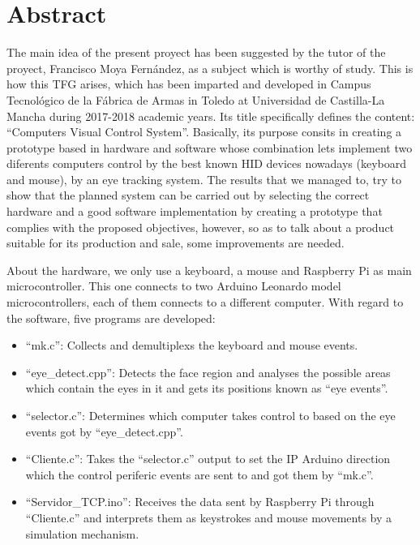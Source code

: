 \newpage
\chapter*{Abstract} \label{abstract}
\pagestyle{empty}
\thispagestyle{empty} 

The main idea of the present proyect has been suggested by the tutor of the proyect, Francisco Moya Fernández, as a subject which is worthy of study. This is how this TFG arises, which has been imparted and developed in Campus Tecnológico de la Fábrica de Armas in Toledo at Universidad de Castilla-La Mancha during 2017-2018 academic years. Its title specifically defines the content: ``Computers Visual Control System''. Basically, its purpose consits in creating a prototype based in hardware and software whose combination lets implement two diferents computers control by the best known HID devices nowadays (keyboard and mouse), by an eye tracking system. The results that we managed to, try to show that the planned system can be carried out by selecting the correct hardware and a good software implementation by creating a prototype that complies with the proposed objectives, however, so as to talk about a product suitable for its production and sale, some improvements are needed.

About the hardware, we only use a keyboard, a mouse and Raspberry Pi as main microcontroller. This one connects to two Arduino Leonardo model microcontrollers, each of them connects to a different computer. With regard to the software, five programs are developed:

\begin{itemize}
    \item ``mk.c'': Collects and demultiplexs the keyboard and mouse events.
    \item ``eye\_detect.cpp'': Detects the face region and analyses the possible areas which contain the eyes in it and gets its positions known as ``eye events''.
    \item ``selector.c'': Determines which computer takes control to based on the eye events got by ``eye\_detect.cpp''.
    \item ``Cliente.c'': Takes the ``selector.c'' output to set the IP Arduino direction which the control periferic events are sent to and got them by ``mk.c''.
    \item ``Servidor\_TCP.ino'': Receives the data sent by Raspberry Pi through ``Cliente.c'' and interprets them as keystrokes and mouse movements by a simulation mechanism.
\end{itemize}